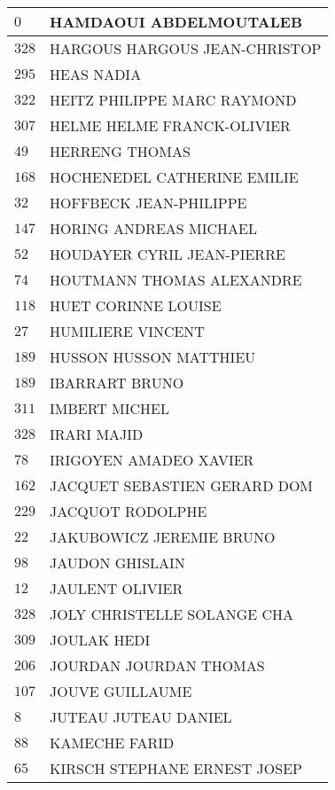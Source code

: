 \begin{xltabular}{\linewidth}{|l|X|}
    \hline
    $0$ & HAMDAOUI ABDELMOUTALEB \\
    \hline
    $328$ & HARGOUS HARGOUS JEAN-CHRISTOP \\
    \hline
    $295$ & HEAS NADIA \\
    \hline
    $322$ & HEITZ PHILIPPE MARC RAYMOND \\
    \hline
    $307$ & HELME HELME FRANCK-OLIVIER \\
    \hline
    $49$ & HERRENG THOMAS \\
    \hline
    $168$ & HOCHENEDEL CATHERINE EMILIE \\
    \hline
    $32$ & HOFFBECK JEAN-PHILIPPE \\
    \hline
    $147$ & HORING ANDREAS MICHAEL \\
    \hline
    $52$ & HOUDAYER CYRIL JEAN-PIERRE \\
    \hline
    $74$ & HOUTMANN THOMAS ALEXANDRE \\
    \hline
    $118$ & HUET CORINNE LOUISE \\
    \hline
    $27$ & HUMILIERE VINCENT \\
    \hline
    $189$ & HUSSON HUSSON MATTHIEU \\
    \hline
    $189$ & IBARRART BRUNO \\
    \hline
    $311$ & IMBERT MICHEL \\
    \hline
    $328$ & IRARI MAJID \\
    \hline
    $78$ & IRIGOYEN AMADEO XAVIER \\
    \hline
    $162$ & JACQUET SEBASTIEN GERARD DOM \\
    \hline
    $229$ & JACQUOT RODOLPHE \\
    \hline
    $22$ & JAKUBOWICZ JEREMIE BRUNO \\
    \hline
    $98$ & JAUDON GHISLAIN \\
    \hline
    $12$ & JAULENT OLIVIER \\
    \hline
    $328$ & JOLY CHRISTELLE SOLANGE CHA \\
    \hline
    $309$ & JOULAK HEDI \\
    \hline
    $206$ & JOURDAN JOURDAN THOMAS \\
    \hline
    $107$ & JOUVE GUILLAUME \\
    \hline
    $8$ & JUTEAU JUTEAU DANIEL \\
    \hline
    $88$ & KAMECHE FARID \\
    \hline
    $65$ & KIRSCH STEPHANE ERNEST JOSEP \\
    \hline

\end{xltabular}
